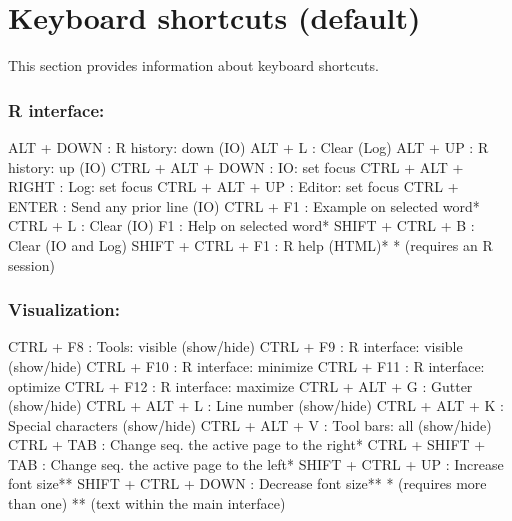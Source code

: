 
\hypertarget{basic_card}{}
\section{Keyboard shortcuts (default)}

This section provides information about keyboard shortcuts.

\hypertarget{basic_card_mostused}{}
\subsubsection{R interface:}

\vspace{-0.5cm}
\begin{Rtables}[caption={[R interface keyboard shortcuts]
    R interface keyboard shortcuts},
  label=hotkey:rinterface]
  ALT   + DOWN            : R history: down (IO)
  ALT   + L               : Clear (Log)
  ALT   + UP              : R history: up (IO)
  CTRL  + ALT + DOWN      : IO: set focus
  CTRL  + ALT + RIGHT     : Log: set focus
  CTRL  + ALT + UP        : Editor: set focus
  CTRL  + ENTER           : Send any prior line (IO)
  CTRL  + F1              : Example on selected word*
  CTRL  + L               : Clear (IO)
  F1                      : Help on selected word*
  SHIFT + CTRL + B        : Clear (IO and Log)
  SHIFT + CTRL + F1       : R help (HTML)*
  * (requires an R session)
\end{Rtables}


\subsubsection{Visualization:}

\vspace{-0.5cm}
\begin{Rtables}[caption={[Visualization keyboard shortcuts]
    Visualization keyboard shortcuts},
  label=hotkey:visualization]
  CTRL  + F8              : Tools: visible (show/hide)
  CTRL  + F9              : R interface: visible (show/hide)
  CTRL  + F10             : R interface: minimize
  CTRL  + F11             : R interface: optimize
  CTRL  + F12             : R interface: maximize
  CTRL  + ALT  + G        : Gutter (show/hide)
  CTRL  + ALT  + L        : Line number (show/hide)
  CTRL  + ALT  + K        : Special characters (show/hide)
  CTRL  + ALT  + V        : Tool bars: all (show/hide)
  CTRL  + TAB             : Change seq. the active page to the right*
  CTRL  + SHIFT + TAB     : Change seq. the active page to the left*
  SHIFT + CTRL + UP       : Increase font size**
  SHIFT + CTRL + DOWN     : Decrease font size**
  *  (requires more than one)
  ** (text within the main interface)
\end{Rtables}


